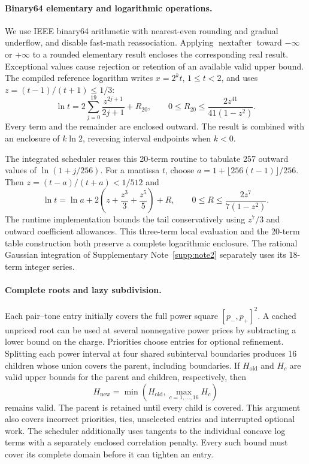 \documentclass[10pt,letterpaper]{article}
\begin{document}
\paragraph{Binary64 elementary and logarithmic operations.}
We use IEEE binary64 arithmetic with nearest-even rounding and gradual underflow, and disable fast-math reassociation. Applying \(\operatorname{nextafter}\) toward \(-\infty\) or \(+\infty\) to a rounded elementary result encloses the corresponding real result. Exceptional values cause rejection or retention of an available valid upper bound. The compiled reference logarithm writes \(x=2^k t\), \(1\leq t<2\), and uses \(z=(t-1)/(t+1)\leq1/3\):
\begin{equation}
 \ln t=2\sum_{j=0}^{19}\frac{z^{2j+1}}{2j+1}+R_{20},
 \qquad
 0\leq R_{20}\leq\frac{2z^{41}}{41(1-z^2)}.
 \label{supp:eq:binarylog}
\end{equation}
Every term and the remainder are enclosed outward. The result is combined with an enclosure of \(k\ln2\), reversing interval endpoints when \(k<0\).

The integrated scheduler reuses this 20-term routine to tabulate 257 outward values of \(\ln(1+j/256)\). For a mantissa \(t\), choose \(a=1+\lfloor256(t-1)\rfloor/256\). Then \(z=(t-a)/(t+a)<1/512\) and
\[
 \ln t=\ln a+2\left(z+\frac{z^3}{3}+\frac{z^5}{5}\right)+R,
 \qquad 0\leq R\leq\frac{2z^7}{7(1-z^2)}.
\]
The runtime implementation bounds the tail conservatively using \(z^7/3\) and outward coefficient allowances. This three-term local evaluation and the 20-term table construction both preserve a complete logarithmic enclosure. The rational Gaussian integration of Supplementary Note~\ref{supp:note2} separately uses its 18-term integer series.

\paragraph{Complete roots and lazy subdivision.}
Each pair--tone entry initially covers the full power square \([p_-,p_+]^2\). A cached unpriced root can be used at several nonnegative power prices by subtracting a lower bound on the charge. Priorities choose entries for optional refinement. Splitting each power interval at four shared subinterval boundaries produces 16 children whose union covers the parent, including boundaries. If \(H_{\mathrm{old}}\) and \(H_c\) are valid upper bounds for the parent and children, respectively, then
\begin{equation}
 H_{\mathrm{new}}=\min\!\left(H_{\mathrm{old}},\max_{c=1,\ldots,16}H_c\right)
 \label{supp:eq:lazyroot}
\end{equation}
remains valid. The parent is retained until every child is covered. This argument also covers incorrect priorities, ties, unselected entries and interrupted optional work. The scheduler additionally uses tangents to the individual concave log terms with a separately enclosed correlation penalty. Every such bound must cover its complete domain before it can tighten an entry.
\end{document}
